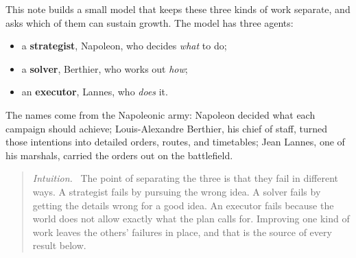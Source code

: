 \documentclass[11pt]{article}
\newcommand{\Nap}{\textcolor{nap}{Napoleon}}
\newcommand{\Ber}{\textcolor{ber}{Berthier}}
\newcommand{\Lan}{\textcolor{lan}{Lannes}}
\theoremstyle{remark}
\newenvironment{intuition}{\begin{quote}\small\color{muted}\textit{Intuition.}\ }{\end{quote}}
\begin{document}
This note builds a small model that keeps these three kinds of work separate, and asks which of them can sustain growth. The model has three agents:
\begin{itemize}
  \item a \textbf{strategist}, \Nap, who decides \emph{what} to do;
  \item a \textbf{solver}, \Ber, who works out \emph{how};
  \item an \textbf{executor}, \Lan, who \emph{does} it.
\end{itemize}
The names come from the Napoleonic army: Napoleon decided what each campaign should achieve; Louis-Alexandre Berthier, his chief of staff, turned those intentions into detailed orders, routes, and timetables; Jean Lannes, one of his marshals, carried the orders out on the battlefield.

\begin{intuition}
The point of separating the three is that they fail in different ways. A strategist fails by pursuing the wrong idea. A solver fails by getting the details wrong for a good idea. An executor fails because the world does not allow exactly what the plan calls for. Improving one kind of work leaves the others' failures in place, and that is the source of every result below.
\end{intuition}
\end{document}

